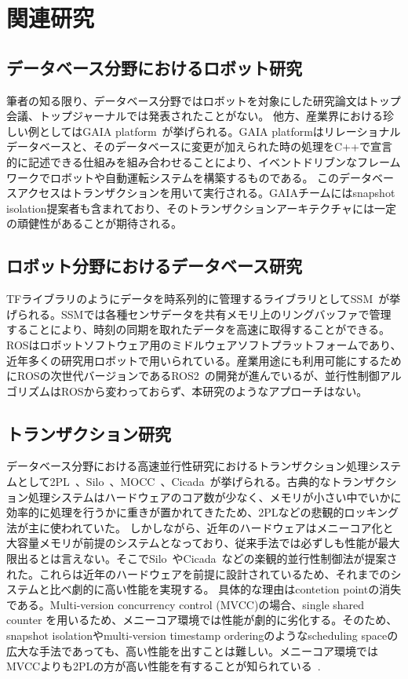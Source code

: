\documentclass[a4paper]{jreport}	%
\begin{document}
\chapter{関連研究}

\section{データベース分野におけるロボット研究}
%
筆者の知る限り、データベース分野ではロボットを対象にした研究論文はトップ会議、トップジャーナルでは発表されたことがない。
%
他方、産業界における珍しい例としてはGAIA platform~\cite{gaia}が挙げられる。GAIA platformはリレーショナルデータベースと、そのデータベースに変更が加えられた時の処理をC++で宣言的に記述できる仕組みを組み合わせることにより、イベントドリブンなフレームワークでロボットや自動運転システムを構築するものである。
このデータベースアクセスはトランザクションを用いて実行される。GAIAチームにはsnapshot isolation提案者も含まれており、そのトランザクションアーキテクチャには一定の頑健性があることが期待される。

\section{ロボット分野におけるデータベース研究}
TFライブラリのようにデータを時系列的に管理するライブラリとしてSSM~\cite{ssm}が挙げられる。SSMでは各種センサデータを共有メモリ上のリングバッファで管理することにより、時刻の同期を取れたデータを高速に取得することができる。
ROSはロボットソフトウェア用のミドルウェアソフトプラットフォームであり、近年多くの研究用ロボットで用いられている。産業用途にも利用可能にするためにROSの次世代バージョンであるROS2~\cite{ros2}の開発が進んでいるが、並行性制御アルゴリズムはROSから変わっておらず、本研究のようなアプローチはない。
\section{トランザクション研究}
データベース分野における高速並行性研究におけるトランザクション処理システムとして2PL~\cite{2PL}、Silo~\cite{silo}、MOCC~\cite{MOCC}、Cicada~\cite{Cicada}が挙げられる。古典的なトランザクション処理システムはハードウェアのコア数が少なく、メモリが小さい中でいかに効率的に処理を行うかに重きが置かれてきたため、2PLなどの悲観的ロッキング法が主に使われていた。
しかしながら、近年のハードウェアはメニーコア化と大容量メモリが前提のシステムとなっており、従来手法では必ずしも性能が最大限出るとは言えない。そこでSilo~\cite{silo}やCicada~\cite{Cicada}などの楽観的並行性制御法が提案された。これらは近年のハードウェアを前提に設計されているため、それまでのシステムと比べ劇的に高い性能を実現する。
具体的な理由はcontetion pointの消失である。Multi-version concurrency control (MVCC)の場合、single shared counter を用いるため、メニーコア環境では性能が劇的に劣化する。そのため、snapshot isolationやmulti-version timestamp orderingのようなscheduling spaceの広大な手法であっても、高い性能を出すことは難しい。メニーコア環境ではMVCCよりも2PLの方が高い性能を有することが知られている~\cite{ccbench}.
\end{document}
